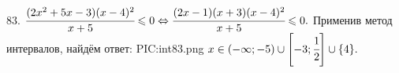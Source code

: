 83. $\cfrac{(2x^2+5x-3)(x-4)^2}{x+5}\leqslant0\Leftrightarrow\cfrac{(2x-1)(x+3)(x-4)^2}{x+5}\leqslant0.$
Применив метод интервалов, найдём ответ:
{{PIC:int83.png}}
$x\in(-\infty;-5)\cup\left[-3;\cfrac{1}{2}\right]\cup\{4\}.$\\
